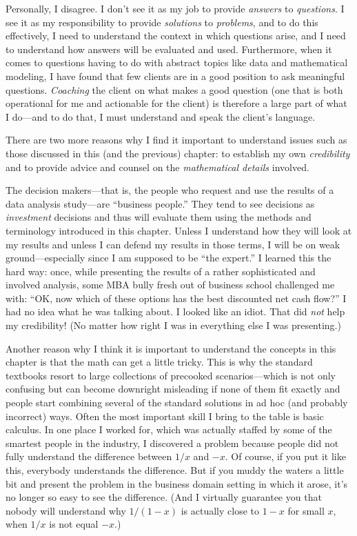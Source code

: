 Personally, I disagree. I don't see it as my job to provide
\emph{answers} to \emph{questions}. I see it as my responsibility to
provide \emph{solutions} to \emph{problems}, and to do this
effectively, I need to understand the context in which questions arise,
and I need to understand how answers will be evaluated and used.
Furthermore, when it comes to questions having to do with abstract
topics like data and mathematical modeling, I have found that few
clients are in a good position to ask meaningful questions.
\emph{Coaching} the client on what makes a good question (one that is
both operational for me and actionable for the client) is therefore a
large part of what I do---and to do that, I must understand and speak
the client's language.

There are two more reasons why I find it important to understand
issues such as those discussed in this (and the previous) chapter:
to establish my own \emph{credibility} and to provide advice and
counsel on the \emph{mathematical details} involved.

The decision makers---that is, the people who request and use the
results of a data analysis study---are ``business people.''  They tend
to see decisions as \emph{investment} decisions and thus will evaluate
them using the methods and terminology introduced in this chapter.
Unless I understand how they will look\vadjust{\pagebreak}  at my results and unless I can
defend my results in those terms, I will be on weak
ground---especially since I am supposed to be ``the expert.'' I
learned this the hard way: once, while presenting the results of a
rather sophisticated and involved analysis, some MBA bully fresh out
of business school challenged me with: ``OK, now which of these
options has the best discounted net cash flow?''  I had no idea what
he was talking about. I looked like an idiot.  That did \emph{not}
help my credibility! (No matter how right I was in everything else I
was presenting.)

Another reason why I think it is important to understand the concepts
in this chapter is that the math can get a little tricky. This is why
the standard textbooks resort to large collections of precooked
scenarios---which is not only confusing but can become downright
misleading if none of them fit exactly and people start combining
several of the standard solutions in ad hoc (and probably incorrect)
ways. Often the most important skill I bring to the table is basic
calculus. In one place I worked for, which was actually staffed by
some of the smartest people in the industry, I discovered a problem
because people did not fully understand the difference between $1/x$
and $-x$. Of course, if you put it like this, everybody understands
the difference. But if you muddy the waters a little bit and present
the problem in the business domain setting in which it arose, it's no
longer so easy to see the difference. (And I virtually guarantee you
that nobody will understand why $1/(1-x)$ is actually close to $1-x$
for small $x$, when $1/x$ is not equal $-x$.)

